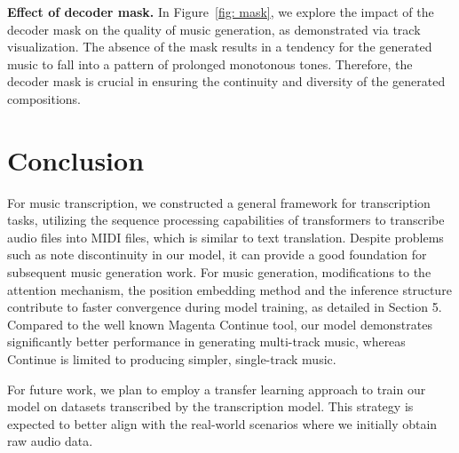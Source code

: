 \documentclass{article}
\begin{document}
\textbf{Effect of decoder mask. } %
In Figure~\ref{fig: mask}, we explore the impact of the decoder mask on the quality of music generation, as demonstrated via track visualization. The absence of the mask results in a tendency for the generated music to fall into a pattern of prolonged monotonous tones. Therefore, the decoder mask is crucial in ensuring the continuity and diversity of the generated compositions.


\section{Conclusion}
For music transcription, we constructed a general framework for transcription tasks, utilizing the sequence processing capabilities of transformers to transcribe audio files into MIDI files, which is similar to text translation.  Despite problems such as note discontinuity in our model, it can provide a good foundation for subsequent music generation work.
For music generation, modifications to the attention mechanism, the position embedding method and the inference structure contribute to faster convergence during model training, as detailed in Section 5. Compared to the well known Magenta Continue tool, our model demonstrates significantly better performance in generating multi-track music, whereas Continue is limited to producing simpler, single-track music.

For future work, we plan to employ a transfer learning approach to train our model on datasets transcribed by the transcription model. This strategy is expected to better align with the real-world scenarios where we initially obtain raw audio data.



\end{document}
